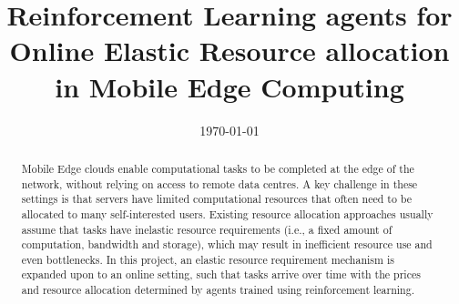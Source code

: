 \documentclass[sotoncolour]{extra/uos_project}     %
\title       {Reinforcement Learning agents for Online Elastic Resource allocation in Mobile Edge Computing}
\date       {\today}
\begin{document}
\frontmatter
\maketitle
\begin{abstract}
Mobile Edge clouds enable computational tasks to be completed at the edge of the network, without relying on access to
remote data centres. A key challenge in these settings is that servers have limited computational resources that often
need to be allocated to many self-interested users. Existing resource allocation approaches usually assume that tasks
have inelastic resource requirements (i.e., a fixed amount of computation, bandwidth and storage), which may result in
inefficient resource use and even bottlenecks. In this project, an elastic resource requirement mechanism is expanded
upon to an online setting, such that tasks arrive over time with the prices and resource allocation determined by
agents trained using reinforcement learning.
\end{abstract}

\tableofcontents
\listoffigures
\listoftables

\end{document}

